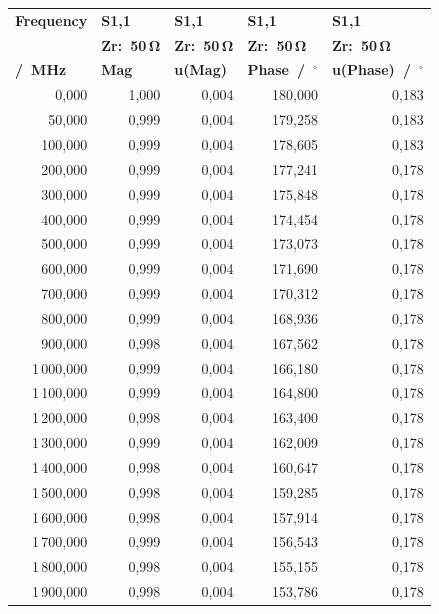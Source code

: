 \begin{longtable}{rrrrr}
\multicolumn{1}{l}{\textbf{Frequency}} & \multicolumn{1}{l}{\textbf{S1,1}} & \multicolumn{1}{l}{\textbf{S1,1}} & \multicolumn{1}{l}{\textbf{S1,1}} & \multicolumn{1}{l}{\textbf{S1,1}}\\
\multicolumn{1}{l}{\textbf{}} & \multicolumn{1}{l}{\textbf{Zr:~50\,$\mathbf{\Omega}$}} & \multicolumn{1}{l}{\textbf{Zr:~50\,$\mathbf{\Omega}$}} & \multicolumn{1}{l}{\textbf{Zr:~50\,$\mathbf{\Omega}$}} & \multicolumn{1}{l}{\textbf{Zr:~50\,$\mathbf{\Omega}$}}\\
\multicolumn{1}{l}{\textbf{/~MHz}} & \multicolumn{1}{l}{\textbf{Mag}} & \multicolumn{1}{l}{\textbf{u(Mag)}} & \multicolumn{1}{l}{\textbf{Phase~/~$\mathbf{^{\circ}}$}} & \multicolumn{1}{l}{\textbf{u(Phase)~/~$\mathbf{^{\circ}}$}}\\
\hline
\endhead
0,000 & 1,000 & 0,004 & 180,000 & 0,183\\
50,000 & 0,999 & 0,004 & 179,258 & 0,183\\
100,000 & 0,999 & 0,004 & 178,605 & 0,183\\
200,000 & 0,999 & 0,004 & 177,241 & 0,178\\
300,000 & 0,999 & 0,004 & 175,848 & 0,178\\
400,000 & 0,999 & 0,004 & 174,454 & 0,178\\
500,000 & 0,999 & 0,004 & 173,073 & 0,178\\
600,000 & 0,999 & 0,004 & 171,690 & 0,178\\
700,000 & 0,999 & 0,004 & 170,312 & 0,178\\
800,000 & 0,999 & 0,004 & 168,936 & 0,178\\
900,000 & 0,998 & 0,004 & 167,562 & 0,178\\
1\,000,000 & 0,999 & 0,004 & 166,180 & 0,178\\
1\,100,000 & 0,999 & 0,004 & 164,800 & 0,178\\
1\,200,000 & 0,998 & 0,004 & 163,400 & 0,178\\
1\,300,000 & 0,999 & 0,004 & 162,009 & 0,178\\
1\,400,000 & 0,998 & 0,004 & 160,647 & 0,178\\
1\,500,000 & 0,998 & 0,004 & 159,285 & 0,178\\
1\,600,000 & 0,998 & 0,004 & 157,914 & 0,178\\
1\,700,000 & 0,999 & 0,004 & 156,543 & 0,178\\
1\,800,000 & 0,998 & 0,004 & 155,155 & 0,178\\
1\,900,000 & 0,998 & 0,004 & 153,786 & 0,178\\

\end{longtable}
